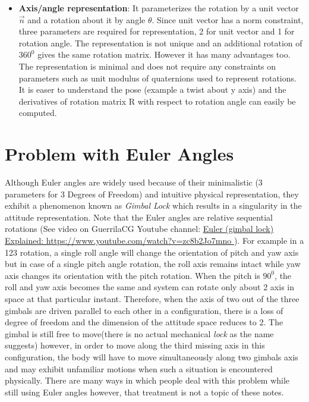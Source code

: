 \documentclass{article}
\begin{document}
\begin{itemize}
	\item \textbf{Axis/angle representation}: It parameterizes the rotation by a unit vector $\vec
	n$ and a rotation about it by angle $\theta$. Since unit vector has a norm constraint, three parameters are required for representation, 2 for unit vector and 1 for rotation angle. The representation is not unique and an additional rotation of $360^0$ gives the same rotation matrix. However it has many advantages too. The representation is minimal and does not require any constraints on parameters such as unit modulus of quaternions used to represent rotations. It is easer to understand the pose (example a twist about y axis) and the derivatives of rotation matrix R with respect to rotation angle can easily be computed.\\
\end{itemize}

\section{Problem with Euler Angles}
Although Euler angles are widely used because of their minimalistic (3 parameters for 3 Degrees of Freedom) and intuitive physical representation, they exhibit a phenomenon known as \textit{Gimbal Lock} which results in a singularity in the attitude representation. Note that the Euler angles are relative sequential rotations (See video on GuerrilaCG Youtube channel: \href{https://www.youtube.com/watch?v=zc8b2Jo7mno
	}{Euler (gimbal lock) Explained: https://www.youtube.com/watch?v=zc8b2Jo7mno
	}). For example in a 123 rotation, a single roll angle will change the orientation of pitch and yaw axis  but in case of a single pitch angle rotation, the roll axis remains intact while yaw axis changes its orientation with the pitch rotation. When the pitch is $90^0$, the roll and yaw axis becomes the same and system can rotate only about 2 axis in space at that particular instant. Therefore, when the axis of two out of the three gimbals are driven parallel to each other in a configuration, there is a loss of degree of freedom and the dimension of the attitude space reduces to 2. The gimbal is still free to move(there is no actual mechanical \textit{lock} as the name suggests) however, in order to move along the third missing axis in this configuration, the body will have to move simultaneously along two gimbals axis and may exhibit unfamiliar motions when such a situation is encountered physically. There are many ways in which people deal with this problem while still using Euler angles however, that treatment is not a topic of these notes.
\end{document}
